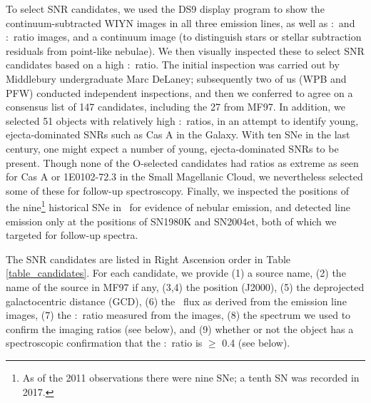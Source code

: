 
To select SNR candidates, we used the DS9 display program to show the continuum-subtracted WIYN images in all three emission lines, as well as \sii:\ha\  and \oiii:\ha\ ratio images, and a continuum image (to distinguish stars  or stellar subtraction residuals from point-like nebulae).   We then visually inspected these to select SNR candidates based on a high  \sii:\ha\ ratio.  The initial inspection was carried out by Middlebury undergraduate Marc DeLaney; subsequently two of us (WPB and PFW) conducted independent inspections, and then we conferred to agree on a consensus list of 147 candidates, including the 27 from MF97.   In addition, we selected 51 objects with relatively high \oiii:\ha\ ratios, in an attempt to identify young, ejecta-dominated SNRs such as Cas A in the Galaxy. With ten SNe in the last century, one might expect a number of young, ejecta-dominated SNRs to be present.  Though none of the O-selected candidates had ratios as extreme as seen for Cas A or 1E0102-72.3 in the Small Magellanic Cloud, we nevertheless selected some of these for follow-up spectroscopy.  Finally, we inspected the positions of the nine\footnote{As of the 2011 observations there were nine SNe; a tenth SN was recorded in 2017.} historical SNe in \gal\ for evidence of nebular emission, and detected line emission only at the positions of SN1980K and SN2004et, both of which we targeted for follow-up spectra.


The SNR candidates are listed in Right Ascension order in Table \ref{table_candidates}.  For each candidate, we provide (1) a source name, (2) the name of the source in MF97 if any,  (3,4) the position  (J2000), (5) the deprojected galactocentric distance (GCD), (6) the \ha\ flux as derived from the emission line images, (7) the \sii:\ha\ ratio measured from the images, (8) the spectrum we used to confirm the imaging ratios (see below), and (9) whether or not the object has a spectroscopic confirmation that the  \sii:\ha\ ratio is $\ge$ 0.4 (see below).


